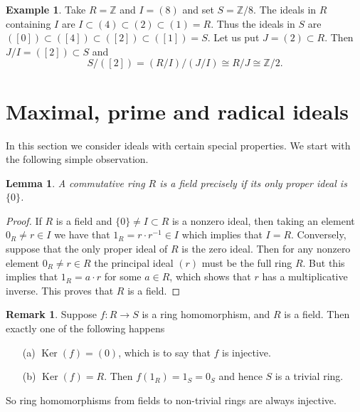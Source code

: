 \documentclass [12pt,oneside,a4paper,mathscr]{amsart}
\newtheorem{lemma}[thm]{Lemma}
\theoremstyle{definition}
\newtheorem{remark}[thm]{Remark}
\newtheorem{example}[thm]{Example}
\newcommand{\Z}{\mathbb Z}
\newcommand{\isom}{\cong}
\renewcommand{\ker}{\operatorname{Ker}}
\begin{document}
\begin{example}
Take $R=\Z$ and $I=(8)$ and set $S=\Z/8$. The ideals in $R$ containing $I$ are $I\subset (4)\subset (2) \subset (1)=R$. Thus the ideals in $S$ are $([0])\subset ([4])\subset ([2])\subset ([1])=S$. Let us put $J=(2)\subset R$. Then $J/I=([2])\subset S$ and
\[S/([2])= (R/I)/(J/I)\isom R/J \isom \Z/2 .\]
\end{example}




\section{Maximal, prime and radical ideals}

In this section we consider ideals with certain special properties. We start with the following simple observation.

\begin{lemma}
\label{field}
A commutative ring $R$ is a field precisely if its only proper ideal is $\{0\}$.
\end{lemma}

\begin{proof}
If $R$ is a field and $\{0\}\neq I\subset R$ is a nonzero ideal, then taking an element $0_R\neq r\in I$  we have that  $1_R=r\cdot r^{-1}\in I$ which implies that  $I=R$. 
Conversely, suppose that  the only proper ideal of $R$ is the zero ideal. Then for any nonzero element $0_R\neq r\in R$ the principal ideal $(r)$ must be the full ring $R$. But this implies that $1_R=a\cdot r$ for some $a\in R$, which shows that $r$ has a multiplicative inverse. This proves  that $R$ is a field.
\end{proof}


\begin{remark}
\label{inj}
Suppose $f\colon R \to S$ is a ring homomorphism, and $R$ is a field. Then  exactly one of the following happens
\begin{itemize}
\item[(a)] $\ker(f)=(0)$, which is to say that $f$ is injective.
\item[(b)] $\ker(f)=R$. Then $f(1_R)=1_S=0_S$ and hence $S$ is a trivial ring.
\end{itemize}
So ring homomorphisms from fields to non-trivial rings are always injective.
\end{remark}
\end{document}
